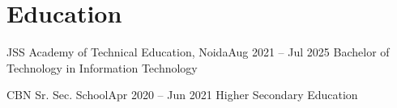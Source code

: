 \section{Education}
\resumeSubHeadingListStart

\resumeSubheading
{JSS Academy of Technical Education, Noida}{Aug 2021 -- Jul 2025}
{Bachelor of Technology in Information Technology}{}

\resumeSubheading
{CBN Sr. Sec. School}{Apr 2020 -- Jun 2021}
{Higher Secondary Education}{}

\resumeSubHeadingListEnd
